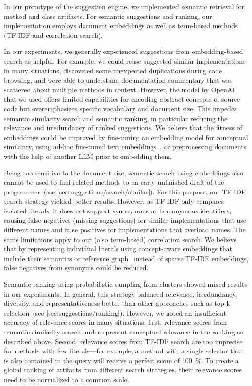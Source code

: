 In our prototype of the suggestion engine, we implemented semantic retrieval for method and class artifacts.
For semantic suggestions and ranking, our implementation employs document embeddings as well as term-based methods (TF-IDF and correlation search).

In our experiments, we generally experienced suggestions from embedding-based search as helpful.
For example, we could reuse suggested similar implementations in many situations, discovered some unexpected duplications during code browsing, and were able to understand documentation commentary that was scattered about multiple methods in context.
However, the  model by OpenAI that we used offers limited capabilities for encoding abstract concepts of source code but overemphasizes specific vocabulary and document size.
This impedes semantic similarity search and semantic ranking, in particular reducing the relevance and irredundancy of ranked suggestions.
We believe that the fitness of embeddings could be improved by fine-tuning an embedding model for conceptual similarity, using ad-hoc fine-tuned text embeddings~\cite{su2023one}, or preprocessing documents with the help of another LLM prior to embedding them.

Being too sensitive to the document size, semantic search using embeddings also cannot be used to find related methods to an early unfinished draft of the programmer~(see \cref{sec:suggestions/search/similar}).
For this purpose, our TF-IDF search strategy yielded better results.
However, as TF-IDF only compares isolated literals, it does not support synonymous or homonymous identifiers, causing false negatives (missing suggestions) for similar implementations that use different names and false positives for implementations that overload names.
The same limitations apply to our (also term-based) correlation search.
We believe that by representing individual literals using concept-aware embeddings that include their semantics or reference graph~\cite{mattis2018semantic} instead of sparse TF-IDF embeddings, false negatives from synonyms could be reduced.

Semantic ranking using probabilistic sampling from clusters showed mixed results in our experiments.
In general, this strategy balanced relevance, irredundancy, diversity, and representativeness better than other approaches such as top-k selection~(see \cref{sec:suggestions/ranking}).
However, we noted an insufficient accuracy of relevance scores in many situations:
first, relevance scores from semantic similarity search underrepresent conceptual relevance in the ranking as described above.
Second, relevance scores from TF-IDF search are too imprecise for methods with few literals---for example, a method with a single selector that is also contained in the query will receive a perfect score of \qty{100}{\percent}.
To create a global ranking of artifacts from different search strategies, their relevance scores need to be normalized to a common scale.


